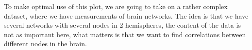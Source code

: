 \documentclass[letterpaper,10pt,english]{jupyterBook}
\begin{document}
\sphinxAtStartPar
To make optimal use of this plot, we are going to take on a rather complex dataset, where we have measurements of brain networks.
The idea is that we have several networks with several nodes in 2 hemispheres, the content of the data is not as important here, what matters is that we want to find correlations between different nodes in the brain.

\begin{sphinxVerbatim}[commandchars=\\\{\}]
   \PYG{p}{[}  \PYG{p}{]} 
\end{sphinxVerbatim}
\end{document}
